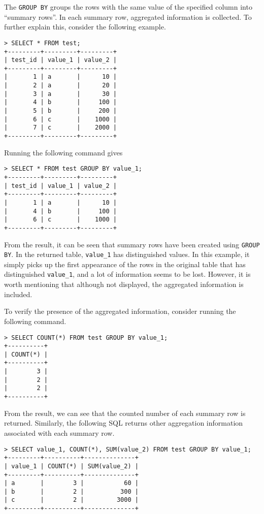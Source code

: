 The \verb|GROUP BY| groups the rows with the same value of the specified column into ``summary rows''. In each summary row, aggregated information is collected. To further explain this, consider the following example.
\begin{lstlisting}
> SELECT * FROM test;
+---------+---------+---------+
| test_id | value_1 | value_2 |
+---------+---------+---------+
|       1 | a       |      10 |
|       2 | a       |      20 |
|       3 | a       |      30 |
|       4 | b       |     100 |
|       5 | b       |     200 |
|       6 | c       |    1000 |
|       7 | c       |    2000 |
+---------+---------+---------+
\end{lstlisting}
Running the following command gives
\begin{lstlisting}
> SELECT * FROM test GROUP BY value_1;
+---------+---------+---------+
| test_id | value_1 | value_2 |
+---------+---------+---------+
|       1 | a       |      10 |
|       4 | b       |     100 |
|       6 | c       |    1000 |
+---------+---------+---------+
\end{lstlisting}
From the result, it can be seen that summary rows have been created using \verb|GROUP BY|. In the returned table, \verb|value_1| has distinguished values. In this example, it simply picks up the first appearance of the rows in the original table that has distinguished \verb|value_1|, and a lot of information seems to be lost. However, it is worth mentioning that although not displayed, the aggregated information is included.

To verify the presence of the aggregated information, consider running the following command.
\begin{lstlisting}
> SELECT COUNT(*) FROM test GROUP BY value_1;
+----------+
| COUNT(*) |
+----------+
|        3 |
|        2 |
|        2 |
+----------+
\end{lstlisting}
From the result, we can see that the counted number of each summary row is returned. Similarly, the following SQL returns other aggregation information associated with each summary row.
\begin{lstlisting}
> SELECT value_1, COUNT(*), SUM(value_2) FROM test GROUP BY value_1;
+---------+----------+--------------+
| value_1 | COUNT(*) | SUM(value_2) |
+---------+----------+--------------+
| a       |        3 |           60 |
| b       |        2 |          300 |
| c       |        2 |         3000 |
+---------+----------+--------------+
\end{lstlisting}

